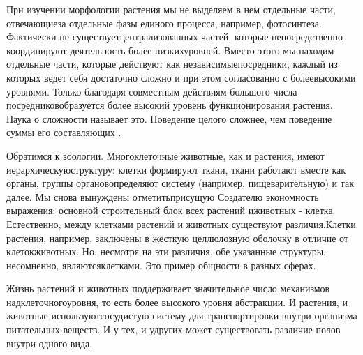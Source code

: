 \documentclass[10pt]{article}
\begin{document}
При изучении морфологии растения мы не выделяем в нем отдельные части, отвечающие\linebreak за отдельные фазы единого процесса, например, фотосинтеза. Фактически не существует\linebreak централизованных частей, которые непосредственно координируют деятельность более низких\linebreak уровней. Вместо этого мы находим отдельные части, которые действуют как независимые\linebreak посредники, каждый из которых ведет себя достаточно сложно и при этом согласованно с более\linebreak высокими уровнями. Только благодаря совместным действиям большого числа посредников\linebreak образуется более высокий уровень функционирования растения. Наука о сложности называет это. Поведение целого сложнее, чем поведение суммы его составляющих \linebreak \cite{Waldrop}. \vspace{3mm}

Обратимся к зоологии. Многоклеточные животные, как и растения, имеют иерархическую\linebreak структуру: клетки формируют ткани, ткани работают вместе как органы, группы органов\linebreak определяют систему (например, пищеварительную) и так далее. Мы снова вынуждены отметить\linebreak присущую Создателю экономность выражения: основной строительный блок всех растений и\linebreak животных - клетка. Естественно, между клетками растений и животных существуют различия.\linebreak Клетки растения, например, заключены в жесткую целлюлозную оболочку в отличие от клеток\linebreak животных. Но, несмотря на эти различия, обе указанные структуры, несомненно, являются\linebreak клетками. Это пример общности в разных сферах. \vspace{3mm}

Жизнь растений и животных поддерживает значительное число механизмов надклеточного\linebreak уровня, то есть более высокого уровня абстракции. И растения, и животные используют\linebreak сосудистую систему для транспортировки внутри организма питательных веществ. И у тех, и у\linebreak других может существовать различие полов внутри одного вида.\vspace{3mm}
 
\end{document}
